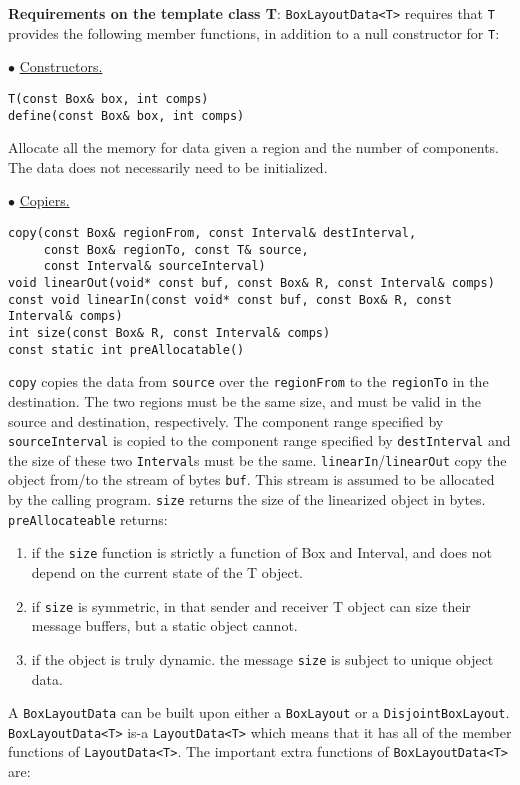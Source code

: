 \noindent
{\bf Requirements on the template class T}:
\verb/BoxLayoutData<T>/ requires that \verb/T/ 
provides the following member functions, in addition to a null constructor for
{\tt T}:
\begin{trivlist}
\item $\bullet$ \underline{Constructors.} 
\begin{verbatim}
T(const Box& box, int comps)
define(const Box& box, int comps)
\end{verbatim}
Allocate all the memory for data
given a region and the number of components.
The data does not necessarily need to
be initialized.
\item $\bullet$ \underline{Copiers.}
\begin{verbatim}
copy(const Box& regionFrom, const Interval& destInterval,
     const Box& regionTo, const T& source, 
     const Interval& sourceInterval) 
void linearOut(void* const buf, const Box& R, const Interval& comps) 
const void linearIn(const void* const buf, const Box& R, const Interval& comps) 
int size(const Box& R, const Interval& comps) 
const static int preAllocatable()
\end{verbatim}
{\tt copy} copies the data from \verb/source/ over the
\verb/regionFrom/ to the \verb/regionTo/ in the destination.  The two
regions must be the same size, and must be valid in the source and
destination, respectively. The component range specified by
\verb/sourceInterval/ is copied to the component range specified by
\verb/destInterval/ and the size of these two {\tt Interval}s must be the same.
{\tt linearIn}/{\tt linearOut} copy the object from/to the stream 
of bytes \verb/buf/.  This stream is assumed to be allocated by the
calling program.
{\tt size} returns the size of the linearized object in bytes.
{\tt preAllocateable} returns:
\begin{enumerate}
\item  if the {\tt size} function is strictly a function 
        of Box and Interval, and does not depend
        on the current state of the T object.
\item if {\tt size} is symmetric, in that sender and receiver T object
        can size their message buffers, but a static object cannot.
\item if the object is truly dynamic.  the message {\tt size} is 
        subject to unique object data.
\end{enumerate}
\end{trivlist}

A \verb/BoxLayoutData/ can be built upon either a {\tt BoxLayout}
or a {\tt DisjointBoxLayout}.
\verb/BoxLayoutData<T>/ is-a \verb/LayoutData<T>/ which
means that it has all of the member functions of \verb/LayoutData<T>/.
The important extra functions of \verb/BoxLayoutData<T>/ are:


